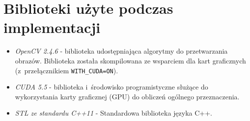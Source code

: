 \chapter{Biblioteki użyte podczas implementacji}
\label{cha:biblioteki}

\begin{itemize}
\item \emph{OpenCV 2.4.6} - biblioteka udostępniająca algorytmy do przetwarzania obrazów. Biblioteka została skompilowana ze wsparciem dla kart graficznych (z~przełącznikiem \texttt{WITH\_CUDA=ON}).
\item \emph{CUDA 5.5} - biblioteka i~środowisko programistyczne służące do wykorzystania karty graficznej (GPU) do obliczeń ogólnego przeznaczenia.
\item \emph{STL ze standardu C++11} - Standardowa biblioteka języka C++.
\end{itemize}
